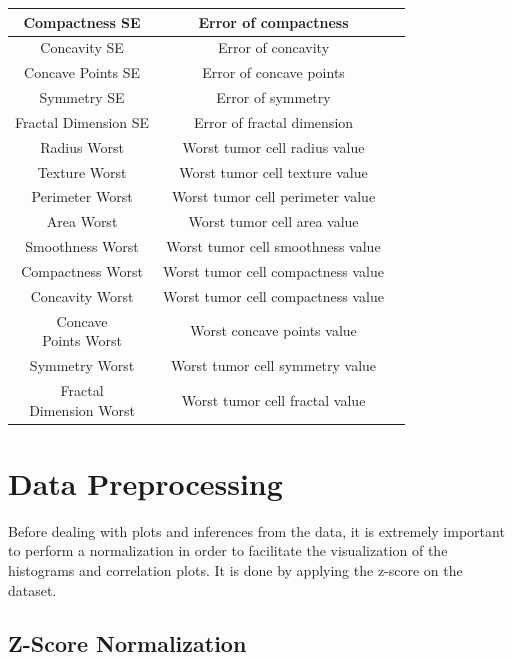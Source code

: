 \documentclass[conference]{IEEEtran}
\begin{document}
\begin{table}[htbp]
\begin{center}
\begin{tabular}{|c|c|c|}
    \hline
    Compactness SE & Error of compactness &  \\
    \hline
    Concavity SE & Error of concavity &  \\
    \hline
    Concave Points SE & Error of concave points &  \\
    \hline
    Symmetry SE & Error of symmetry &  \\
    \hline
    Fractal Dimension SE & Error of fractal dimension &  \\
    \hline
    Radius Worst & Worst tumor cell radius value &  \\
    \hline
    Texture Worst & Worst tumor cell texture value &  \\
    \hline
    Perimeter Worst &  Worst tumor cell perimeter value&  \\
    \hline
    Area Worst &  Worst tumor cell area value &  \\
    \hline
    Smoothness Worst & Worst tumor cell smoothness value &  \\
    \hline
    Compactness Worst &  Worst tumor cell compactness value &  \\
    \hline
    Concavity Worst & Worst tumor cell compactness value &  \\
    \hline
    \makecell{Concave \\ Points Worst} & Worst concave points value &  \\
    \hline
    Symmetry Worst & Worst tumor cell symmetry value &  \\
    \hline
    \makecell{Fractal \\ Dimension Worst} & Worst tumor cell fractal value &  \\
    \hline
\end{tabular}
\label{tab:Summary}
\end{center}
\end{table}


\section{Data Preprocessing}
Before dealing with plots and inferences from the data, it is extremely important to 
perform a normalization in order to facilitate the visualization of the histograms 
and correlation plots. It is done by applying the z-score on the dataset.

\subsection{Z-Score Normalization}
\end{document}
